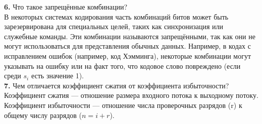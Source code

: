 \textbf{6.} Что такое запрещённые комбинации? \\
В некоторых системах кодирования часть комбинаций битов может быть зарезервирована для специальных целей, таких как синхронизация или служебные команды. Эти комбинации называются запрещёнными, так как они не могут использоваться для представления обычных данных. Например, в кодах с исправлением ошибок (например, код Хэмминга), некоторые комбинации могут указывать на ошибку или на факт того, что кодовое слово повреждено (если среди $s_i$ есть значение 1). \\
\textbf{7.} Чем отличается коэффициент сжатия от коэффициента избыточности? \\
Коэффициент сжатия — отношение размера входного потока к выходному потоку. Коэффициент избыточности — отношение числа проверочных разрядов (r) к общему числу разрядов ($n = i + r$).





